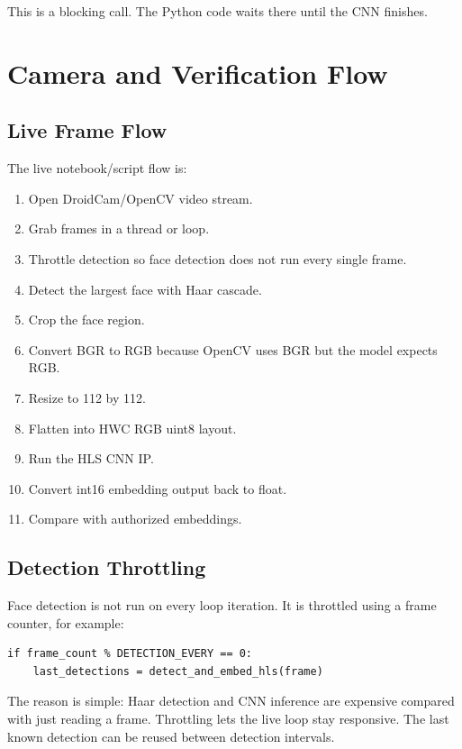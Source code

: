 \documentclass[11pt]{article}
\begin{document}
This is a blocking call.
The Python code waits there until the CNN finishes.

\section{Camera and Verification Flow}

\subsection{Live Frame Flow}

The live notebook/script flow is:

\begin{enumerate}[leftmargin=1.6em]
  \item Open DroidCam/OpenCV video stream.
  \item Grab frames in a thread or loop.
  \item Throttle detection so face detection does not run every single frame.
  \item Detect the largest face with Haar cascade.
  \item Crop the face region.
  \item Convert BGR to RGB because OpenCV uses BGR but the model expects RGB.
  \item Resize to 112 by 112.
  \item Flatten into HWC RGB uint8 layout.
  \item Run the HLS CNN IP.
  \item Convert int16 embedding output back to float.
  \item Compare with authorized embeddings.
\end{enumerate}

\subsection{Detection Throttling}

Face detection is not run on every loop iteration.
It is throttled using a frame counter, for example:

\begin{lstlisting}
if frame_count % DETECTION_EVERY == 0:
    last_detections = detect_and_embed_hls(frame)
\end{lstlisting}

The reason is simple:
Haar detection and CNN inference are expensive compared with just reading a frame.
Throttling lets the live loop stay responsive.
The last known detection can be reused between detection intervals.
\end{document}

